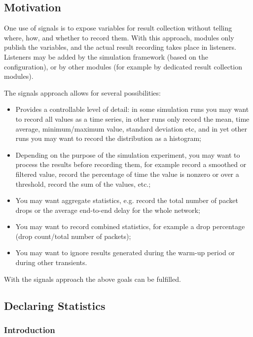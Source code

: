 \begin{ned}
\subsection{Motivation}
\label{sec:simple-modules:signal-based-statistics-motivation}

One use of signals is to expose variables for result collection without
telling where, how, and whether to record them. With this approach,
modules only publish the variables, and the actual result recording
takes place in listeners. Listeners may be added by the simulation
framework (based on the configuration), or by other modules (for example
by dedicated result collection modules).

The signals approach allows for several possibilities:

\begin{itemize}
 \item Provides a controllable level of detail: in some simulation runs
    you may want to record all values as a time series, in other runs
    only record the mean, time average, minimum/maximum value, standard
    deviation etc, and in yet other runs you may want to record the
    distribution as a histogram;
 \item Depending on the purpose of the simulation experiment, you may want
    to process the results before recording them, for example
    record a smoothed or filtered value, record the percentage of time the
    value is nonzero or over a threshold, record the sum of the values, etc.;
 \item You may want aggregate statistics, e.g. record the total number
    of packet drops or the average end-to-end delay for the whole network;
 \item You may want to record combined statistics, for example a drop
    percentage (drop count/total number of packets);
 \item You may want to ignore results generated during the warm-up period
    or during other transients.
\end{itemize}

With the signals approach the above goals can be fulfilled.


\subsection{Declaring Statistics}
\label{sec:simple-modules:declaring-statistics}

\subsubsection{Introduction}
\label{sec:simple-modules:declared-statistics:introduction}


\end{ned}

